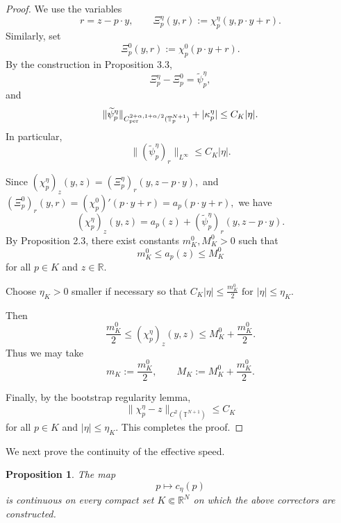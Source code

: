 \documentclass[preprint]{elsarticle}
\newtheorem{proposition}{Proposition}[section]
\numberwithin{equation}{section}
\begin{document}
\begin{proof}
We use the variables
$$
r=z-p\cdot y,
\qquad
\Xi_p^\eta(y,r):=\chi_p^\eta(y,p\cdot y+r).
$$
Similarly, set
$$
\Xi_p^0(y,r):=\chi_p^0(p\cdot y+r).
$$
By the construction in Proposition 3.3,
\begin{equation*}
\Xi_p^\eta-\Xi_p^0=\widetilde\psi_p^\eta,
\end{equation*}
and
\begin{equation*}
\|\widetilde\psi_p^\eta\|_{C_{\rm per}^{2+\alpha,1+\alpha/2}(\mathbb T_p^{N+1})}
+
|\kappa_p^\eta|
\le C_K|\eta|.
\end{equation*}
In particular,
\begin{equation*}
\|(\widetilde\psi_p^\eta)_r\|_{L^\infty}\le C_K|\eta|.
\end{equation*}

Since
$
(\chi_p^\eta)_z(y,z)
=
(\Xi_p^\eta)_r(y,z-p\cdot y),
$
and
$
(\Xi_p^0)_r(y,r)
=
(\chi_p^0)'(p\cdot y+r)
=
a_p(p\cdot y+r),
$
we have
\begin{equation*}
(\chi_p^\eta)_z(y,z)
=
a_p(z)+(\widetilde\psi_p^\eta)_r(y,z-p\cdot y).
\end{equation*}
By Proposition 2.3, there exist constants $m_K^0,M_K^0>0$ such that
\begin{equation*}
m_K^0\le a_p(z)\le M_K^0
\end{equation*}
for all $p\in K$ and $z\in\mathbb R$.

Choose $\eta_K>0$ smaller if necessary so that $C_K|\eta|\le\frac{m_K^0}{2}
\text{ for }|\eta|\le\eta_K.$

Then
\begin{equation*}
\frac{m_K^0}{2}
\le
(\chi_p^\eta)_z(y,z)
\le
M_K^0+\frac{m_K^0}{2}.
\end{equation*}
Thus we may take
$$
m_K:=\frac{m_K^0}{2},
\qquad
M_K:=M_K^0+\frac{m_K^0}{2}.
$$

Finally, by the bootstrap regularity lemma,
\begin{equation*}
\|\chi_p^\eta-z\|_{C^2(\mathbb T^{N+1})}\le C_K
\end{equation*}
for all $p\in K$ and $|\eta|\le\eta_K$. This completes the proof.
\end{proof}
We next prove the continuity of the effective speed.
\begin{proposition}
The map
$$
p\longmapsto c_\eta(p)
$$
is continuous on every compact set $K\Subset\mathbb R^N$ on which the above correctors are constructed.
\end{proposition}
\end{document}
